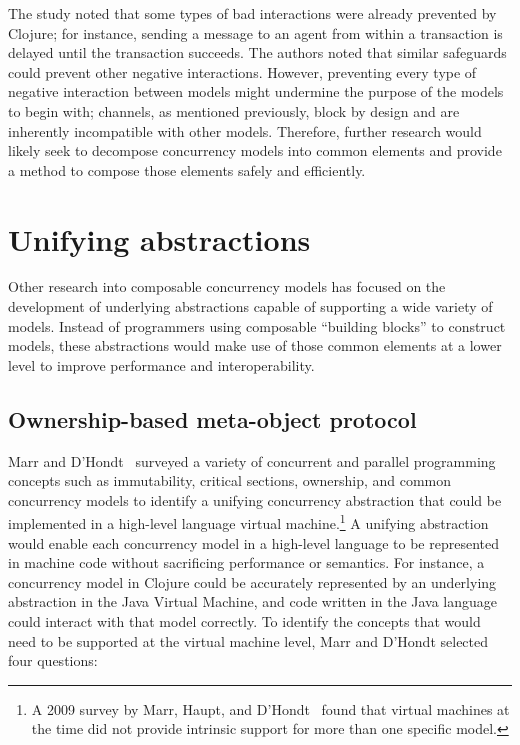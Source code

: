 \documentclass{sig-alternate}
\begin{document}
The study noted that some types of bad interactions were already prevented by Clojure; for instance, sending a message to an agent from within a transaction is delayed until the transaction succeeds. The authors noted that similar safeguards could prevent other negative interactions. However, preventing every type of negative interaction between models might undermine the purpose of the models to begin with; channels, as mentioned previously, block by design and are inherently incompatible with other models. Therefore, further research would likely seek to decompose concurrency models into common elements and provide a method to compose those elements safely and efficiently.

\section{Unifying abstractions}

Other research into composable concurrency models has focused on the development of underlying abstractions capable of supporting a wide variety of models. Instead of programmers using composable ``building blocks'' to construct models, these abstractions would make use of those common elements at a lower level to improve performance and interoperability.

\subsection{Ownership-based meta-object protocol}

Marr and D'Hondt~\cite{Marr2012} surveyed a variety of concurrent and parallel programming concepts such as immutability, critical sections, ownership, and common concurrency models to identify a unifying concurrency abstraction that could be implemented in a high-level language virtual machine.\footnote{A 2009 survey by Marr, Haupt, and D'Hondt~\cite{Marr2009} found that virtual machines at the time did not provide intrinsic support for more than one specific model.} A unifying abstraction would enable each concurrency model in a high-level language to be represented in machine code without sacrificing performance or semantics. For instance, a concurrency model in Clojure could be accurately represented by an underlying abstraction in the Java Virtual Machine, and code written in the Java language could interact with that model correctly. To identify the concepts that would need to be supported at the virtual machine level, Marr and D'Hondt selected four questions:
\end{document}
